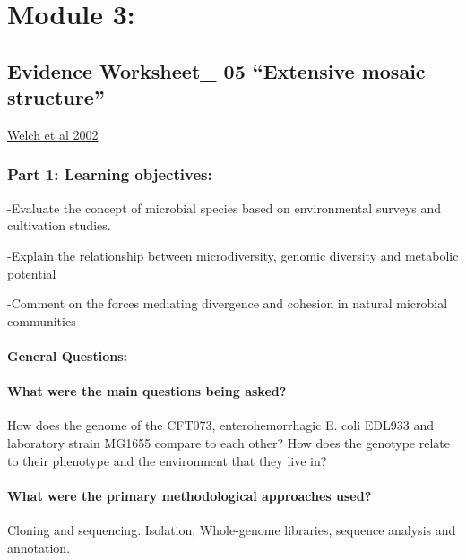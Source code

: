 \documentclass[]{article}
\let\oldparagraph\paragraph
\renewcommand{\paragraph}[1]{\oldparagraph{#1}\mbox{}}
\begin{document}
\section{Module 3:}\label{module-3}

\subsection{\texorpdfstring{Evidence Worksheet\_ 05 ``Extensive mosaic
structure''}{Evidence Worksheet\_ 05 Extensive mosaic structure}}\label{evidence-worksheet_-05-extensive-mosaic-structure}

\href{https://www.ncbi.nlm.nih.gov/pubmed/12471157}{Welch et al 2002}

\subsubsection{Part 1: Learning
objectives:}\label{part-1-learning-objectives}

-Evaluate the concept of microbial species based on environmental
surveys and cultivation studies.

-Explain the relationship between microdiversity, genomic diversity and
metabolic potential

-Comment on the forces mediating divergence and cohesion in natural
microbial communities

\paragraph{General Questions:}\label{general-questions-2}

\paragraph{What were the main questions being
asked?}\label{what-were-the-main-questions-being-asked-3}

How does the genome of the CFT073, enterohemorrhagic E. coli EDL933 and
laboratory strain MG1655 compare to each other? How does the genotype
relate to their phenotype and the environment that they live in?

\paragraph{What were the primary methodological approaches
used?}\label{what-were-the-primary-methodological-approaches-used-3}

Cloning and sequencing. Isolation, Whole-genome libraries, sequence
analysis and annotation.
\end{document}
